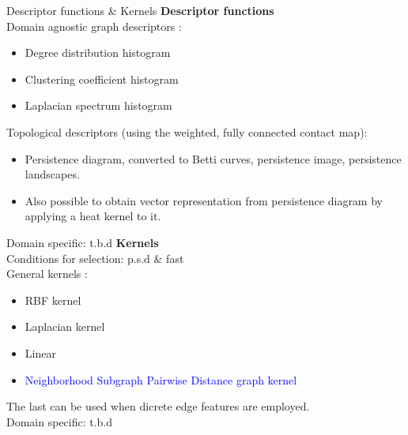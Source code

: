 \documentclass[aspectratio=169, 10pt, dvipsnames, handout]{beamer}
\begin{document}
\begin{frame}[fragile]{Descriptor functions \& Kernels}
  \textbf{Descriptor functions} \\
  Domain agnostic graph descriptors \cite{o2021evaluation}:
  \begin{itemize}
  \item Degree distribution histogram
  \item Clustering coefficient histogram
  \item Laplacian spectrum histogram
  \end{itemize}

  Topological descriptors (using the weighted, fully connected contact map):
  \begin{itemize}
  \item Persistence diagram, converted to Betti curves, persistence image, persistence landscapes. \cite{tauzin2021giotto}
  \item Also possible to obtain vector representation from persistence diagram by applying a heat kernel to it. \cite{reininghaus2015stable}
  \end{itemize}

  Domain specific: t.b.d
  \endminipage
  \hfill\vline\hfill
  \endminipage
  \textbf{Kernels} \\
  Conditions for selection: p.s.d \& fast\\
  General kernels \cite{o2021evaluation}:
    \begin{itemize}
    \item RBF kernel
    \item Laplacian kernel
    \item Linear
    \item \textcolor{blue}{Neighborhood Subgraph Pairwise Distance graph kernel} \cite{costa2010fast}
    \end{itemize}
    The last can be used when dicrete edge features are employed.\\
  Domain specific: t.b.d
  \endminipage
\end{frame}
\end{document}
